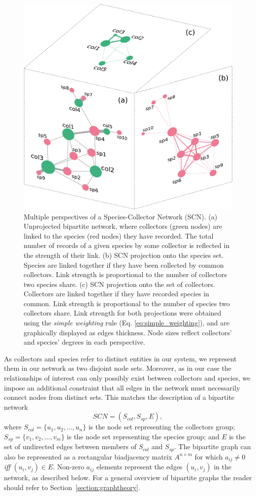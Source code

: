 {  \begin{figure}[h!]
  	\centering
    \includegraphics[width=.7\linewidth]{figures/network_models/scn_generalaspect.pdf}
    \caption[General aspect of a Species-Collector Network (SCN)]{Multiple perspectives of a Species-Collector Network (SCN).
    (a) Unprojected bipartite network, where collectors (green nodes) are linked to the species (red nodes) they have recorded. The total number of records of a given species by some collector is reflected in the strength of their link. (b) SCN projection onto the species set. Species are linked together if they have been collected by common collectors. Link strength is proportional to the number of collectors two species share. (c) SCN projection onto the set of collectors. Collectors are linked together if they have recorded species in common. Link strength is proportional to the number of species two collectors share. 
    Link strength for both projections were obtained using the \textit{simple weighting} rule (Eq. \ref{eq:simple_weighting}), and are graphically displayed as edges thickness. Node sizes reflect collectors' and species' degrees in each perspective.}
    \label{fig:scn_general}
  \end{figure}
  
As collectors and species refer to distinct entities in our system, we represent them in our network as two disjoint node sets.
Moreover, as in our case the relationships of interest can only possibly exist between collectors and species, we impose an additional constraint that all edges in the network must necessarily connect nodes from distinct sets.
This matches the description of a bipartite network
$$ SCN = (S_{col},S_{sp},E),$$
where $S_{col} = \{u_1, u_2, ..., u_n \}$ is the node set representing the collectors group; $S_{sp}=\{v_1,v_2, ..., v_m\}$ is the node set representing the species group; and $E$ is the set of undirected edges between members of $S_{col}$ and $S_{sp}$.
The bipartite graph can also be represented as a rectangular biadjacency matrix $A^{n\times m}$ for which $a_{ij}\neq 0$ \textit{iff} $(u_i,v_j) \in E$. 
Non-zero $a_{ij}$ elements represent the edges $(u_i,v_j)$ in the network, as described below. 
For a general overview of bipartite graphs the reader should refer to Section~\ref{section:graphtheory}.
  
}
